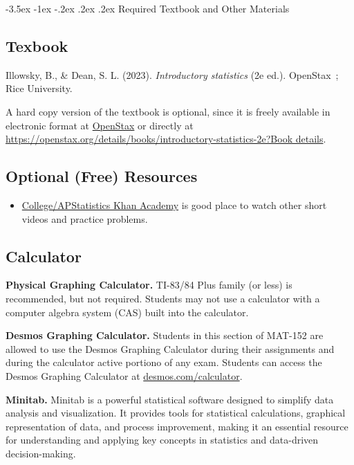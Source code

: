 \documentclass[11pt]{article}
\makeatletter
\renewcommand\section{\@startsection{section}{1}{0pt}%
  {-3.5ex \@plus -1ex \@minus -.2ex}%
  {.2ex \@plus.2ex}%
  {\normalfont\Large\bfseries}} %
\makeatother
\begin{document}
\section{Required Textbook and Other Materials}

\subsection{Texbook}

Illowsky, B., \& Dean, S. L. (2023). \textit{Introductory statistics} (2e ed.). OpenStax~; Rice University.

A hard copy version of the textbook is optional, since it is freely available in electronic format at \href{https://openstax.org/details/books/introductory-statistics-2e?Book\%20details}{OpenStax} or directly at \href{https://openstax.org/details/books/introductory-statistics-2e?Book\%20details}{https://openstax.org/details/books/introductory-statistics-2e?Book details}.

\subsection{Optional (Free) Resources}

\begin{itemize}
\item \href{https://www.khanacademy.org/math/ap-statistics}{College/AP\texttrademark  Statistics Khan Academy} is good place to watch other short videos and practice problems.
\end{itemize}

\subsection{Calculator}

\textbf{Physical Graphing Calculator.} TI-83/84 Plus family (or less) is recommended, but not required. Students may not use a calculator with a computer algebra system (CAS) built into the calculator.

\textbf{Desmos Graphing Calculator.} Students in this section of MAT-152 are allowed to use the Desmos Graphing Calculator during their assignments and during the calculator active portiono of any exam. Students can access the Desmos Graphing Calculator at \href{https://www.desmos.com/calculator}{desmos.com/calculator}.

\textbf{Minitab.} Minitab is a powerful statistical software designed to simplify data analysis and visualization. It provides tools for statistical calculations, graphical representation of data, and process improvement, making it an essential resource for understanding and applying key concepts in statistics and data-driven decision-making.
\end{document}
